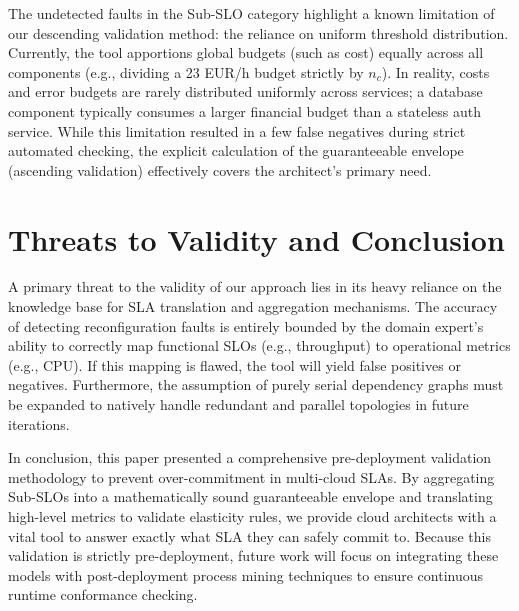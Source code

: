 \documentclass[conference]{IEEEtran}
\begin{document}
The undetected faults in the Sub-SLO category highlight a known limitation of our descending validation method: the reliance on uniform threshold distribution. Currently, the tool apportions global budgets (such as cost) equally across all components (e.g., dividing a 23 EUR/h budget strictly by $n_c$). In reality, costs and error budgets are rarely distributed uniformly across services; a database component typically consumes a larger financial budget than a stateless auth service. While this limitation resulted in a few false negatives during strict automated checking, the explicit calculation of the guaranteeable envelope (ascending validation) effectively covers the architect's primary need.

\section{Threats to Validity and Conclusion}\label{sec:concl}

A primary threat to the validity of our approach lies in its heavy reliance on the knowledge base for SLA translation and aggregation mechanisms. The accuracy of detecting reconfiguration faults is entirely bounded by the domain expert's ability to correctly map functional SLOs (e.g., throughput) to operational metrics (e.g., CPU). If this mapping is flawed, the tool will yield false positives or negatives. Furthermore, the assumption of purely serial dependency graphs must be expanded to natively handle redundant and parallel topologies in future iterations.

In conclusion, this paper presented a comprehensive pre-deployment validation methodology to prevent over-commitment in multi-cloud SLAs. By aggregating Sub-SLOs into a mathematically sound guaranteeable envelope and translating high-level metrics to validate elasticity rules, we provide cloud architects with a vital tool to answer exactly what SLA they can safely commit to. Because this validation is strictly pre-deployment, future work will focus on integrating these models with post-deployment process mining techniques to ensure continuous runtime conformance checking.


\nocite{mechouche2021reconfig,avizienis2004dependability,flexera2024}

\end{document}
